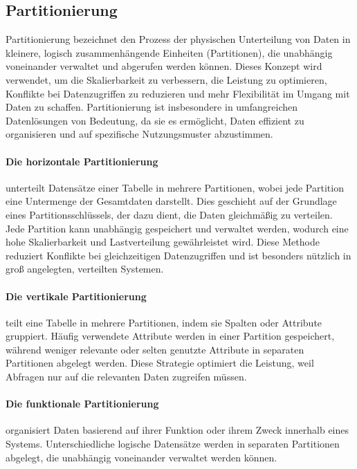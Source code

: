 
\subsection{Partitionierung}

Partitionierung bezeichnet den Prozess der physischen Unterteilung von Daten in kleinere, logisch zusammenhängende
Einheiten (Partitionen), die unabhängig voneinander verwaltet und abgerufen werden können.
Dieses Konzept wird verwendet, um die Skalierbarkeit zu verbessern, die Leistung zu optimieren, Konflikte
bei Datenzugriffen zu reduzieren und mehr Flexibilität im Umgang mit Daten zu schaffen.
Partitionierung ist insbesondere in umfangreichen Datenlösungen von Bedeutung, da sie es ermöglicht,
Daten effizient zu organisieren und auf spezifische Nutzungsmuster abzustimmen.


\paragraph{Die horizontale Partitionierung} unterteilt Datensätze einer Tabelle in mehrere Partitionen,
wobei jede Partition eine Untermenge der Gesamtdaten darstellt.
Dies geschieht auf der Grundlage eines Partitionsschlüssels, der dazu dient, die Daten gleichmäßig zu verteilen.
Jede Partition kann unabhängig gespeichert und verwaltet werden, wodurch eine hohe Skalierbarkeit und
Lastverteilung gewährleistet wird.
Diese Methode reduziert Konflikte bei gleichzeitigen Datenzugriffen und ist besonders nützlich in groß angelegten,
verteilten Systemen.
\paragraph{Die vertikale Partitionierung} teilt eine Tabelle in mehrere Partitionen,
indem sie Spalten oder Attribute gruppiert.
Häufig verwendete Attribute werden in einer Partition gespeichert, während weniger relevante oder selten genutzte
Attribute in separaten Partitionen abgelegt werden.
Diese Strategie optimiert die Leistung, weil Abfragen nur auf die relevanten Daten zugreifen müssen.
\paragraph{Die funktionale Partitionierung} organisiert Daten basierend auf ihrer Funktion oder ihrem Zweck
innerhalb eines Systems.
Unterschiedliche logische Datensätze werden in separaten Partitionen abgelegt, die unabhängig voneinander verwaltet
werden können.
